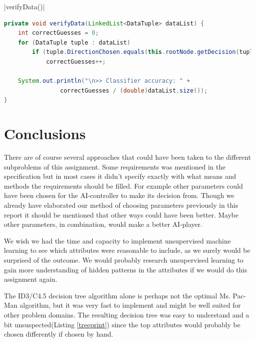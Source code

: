 \documentclass{article}
\begin{document}
    |verifyData()|
    \begin{lstlisting}[language=Java, caption=The \protect\UseVerb{verify} method, label={verifycode}, escapechar=|]
private void verifyData(LinkedList<DataTuple> dataList) {
	int correctGuesses = 0;
	for (DataTuple tuple : dataList)
		if (tuple.DirectionChosen.equals(this.rootNode.getDecision(tuple)))
			correctGuesses++;

	System.out.println("\n>> Classifier accuracy: " +
	            correctGuesses / (double)dataList.size());
} \end{lstlisting}

\section{Conclusions}
There are of course several approaches that could have been taken to the different subproblems of this assignment. Some requirements was mentioned in the specification but in most cases it didn't specify exactly with what means and methods the requirements should be filled. For example other parameters could have been chosen for the AI-controller to make its decision from. Though we already have elaborated our method of choosing parameters previously in this report it should be mentioned that other ways could have been better. Maybe other parameters, in combination, would make a better AI-player.

We wish we had the time and capacity to implement unsupervised machine learning to see which attributes were reasonable to include, as we surely would be surprised of the outcome. We would probably research unsupervised learning to gain more understanding of hidden patterns in the attributes if we would do this assignment again.

The ID3/C4.5 decision tree algorithm alone is perhaps not the optimal Ms. Pac-Man algorithm, but it was very fast to implement and might be well suited for other problem domains. The resulting decision tree was easy to understand and a bit unsuspected(Listing \ref{treeprint}) since the top attributes would probably be chosen differently if chosen by hand.
\end{document}
